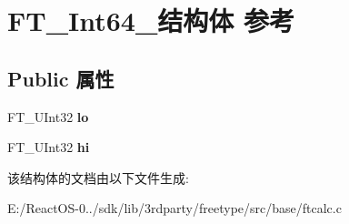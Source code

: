 \hypertarget{struct_f_t___int64__}{}\section{F\+T\+\_\+\+Int64\+\_\+结构体 参考}
\label{struct_f_t___int64__}
\subsection*{Public 属性}
\begin{DoxyCompactItemize}
\item 
\mbox{\label{struct_f_t___int64___a19485f29df4af00e82b1588232290794}} 
F\+T\+\_\+\+U\+Int32 {\bfseries lo}
\item 
\mbox{\label{struct_f_t___int64___a92d342fe6bbdf97548304aaba6c27410}} 
F\+T\+\_\+\+U\+Int32 {\bfseries hi}
\end{DoxyCompactItemize}


该结构体的文档由以下文件生成\+:\begin{DoxyCompactItemize}
\item 
E\+:/\+React\+O\+S-\/0../sdk/lib/3rdparty/freetype/src/base/ftcalc.\+c\end{DoxyCompactItemize}
